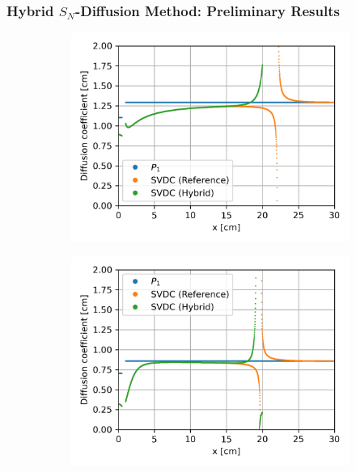 \begin{frame}
  \frametitle{Hybrid $S_N$-Diffusion Method: Preliminary Results}
  \begin{figure}
    \centering
    \begin{subfigure}[t]{.35\textwidth}
      \centering
      \includegraphics[width=\textwidth]{../images/case-3b-group-1-diffcoef}
      \label{fig:c3bg1dc}
    \end{subfigure}
    \begin{subfigure}[t]{.35\textwidth}
      \centering
      \includegraphics[width=\textwidth]{../images/case-3b-group-2-diffcoef}
      \label{fig:c3bg2dc}
    \end{subfigure}
    \begin{subfigure}[t]{.35\textwidth}

\end{subfigure}
\end{figure}
\end{frame}
